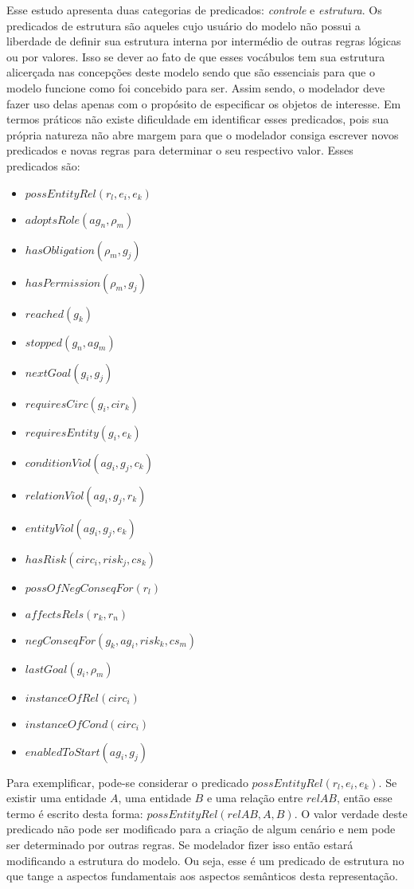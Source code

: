 Esse estudo apresenta duas categorias de predicados: \textit{controle} e \textit{estrutura}. Os predicados de estrutura são aqueles cujo usuário do modelo não possui a liberdade de definir sua estrutura interna por intermédio de outras regras lógicas ou por valores. Isso se dever ao fato de que esses vocábulos tem sua estrutura alicerçada nas concepções deste modelo sendo que são essenciais para que o modelo funcione como foi concebido para ser. Assim sendo, o modelador deve fazer uso delas apenas com o propósito de especificar os objetos de interesse. Em termos práticos não existe dificuldade em identificar esses predicados, pois sua própria natureza não abre margem para que o modelador consiga escrever novos predicados e novas regras para determinar o seu respectivo valor. Esses predicados são:

\begin{itemize}
    \item $possEntityRel(r_l,e_i,e_k)$
    \item $adoptsRole(ag_n,\rho_m)$
    \item $hasObligation(\rho_m,g_j)$
    \item $hasPermission(\rho_m, g_j)$
    \item $reached(g_k)$
    \item $stopped(g_n, ag_m)$
    \item $nextGoal(g_i,g_j)$
    \item $requiresCirc(g_i,cir_k)$
    \item $requiresEntity(g_i,e_k)$
    \item $conditionViol(ag_i,g_j,c_k)$
    \item $relationViol(ag_i,g_j,r_k)$
    \item $entityViol(ag_i,g_j,e_k)$
    \item $hasRisk(circ_i, risk_j, cs_k)$
    \item $possOfNegConseqFor(r_l)$
    \item $affectsRels(r_k,r_n)$
    \item $negConseqFor(g_k, ag_i,risk_k,cs_m)$
    \item $lastGoal(g_i,\rho_m)$
    \item $instanceOfRel(circ_i)$
    \item $instanceOfCond(circ_i)$
    \item $enabledToStart(ag_i,g_j)$ 
\end{itemize}

Para exemplificar, pode-se considerar o predicado $possEntityRel(r_l,e_i,e_k)$. Se existir uma entidade $A$, uma entidade $B$ e uma relação entre $relAB$, então esse termo é escrito desta forma: $possEntityRel(relAB,A,B)$. O valor verdade deste predicado não pode ser modificado para a criação de algum cenário e nem pode ser determinado por outras regras. Se modelador fizer isso então estará modificando a estrutura do modelo. Ou seja, esse é um predicado de estrutura no que tange a aspectos fundamentais aos aspectos semânticos desta representação. 

